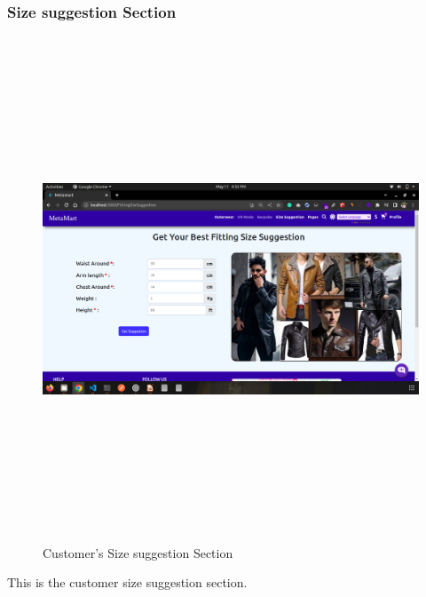 \subsubsection{Size suggestion Section}
\begin{figure}[H]
    \centering
    \includegraphics[width=15cm,height=15cm]{Figures/Websites/Customer/CustomerSizeSugestion.png}
    \caption{Customer’s Size suggestion Section}
    \label{fig:Size suggestion Section}
\end{figure}
\justifying

This is the customer size suggestion section.